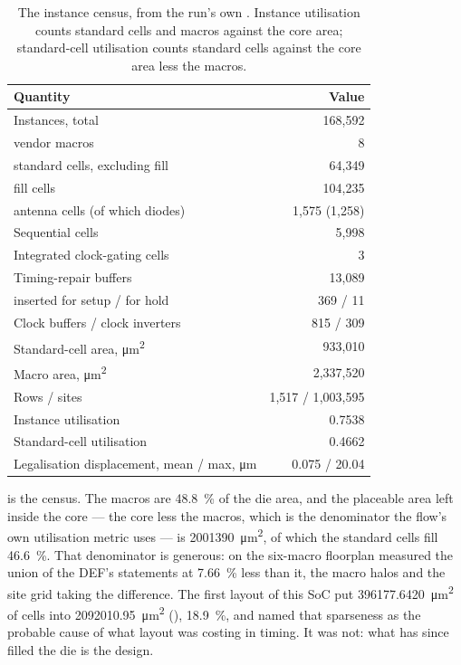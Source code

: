 \begin{table}[tbp]
\centering
\caption{The instance census, from the run's own
. Instance utilisation counts standard cells
and macros against the core area; standard-cell utilisation counts
standard cells against the core area less the macros.}
\label{tab:phys-census}
\small
\begin{tabular}{@{}lr@{}}
\toprule
\textbf{Quantity} & \textbf{Value} \\
\midrule
Instances, total & 168{,}592 \\
\quad vendor macros & 8 \\
\quad standard cells, excluding fill & 64{,}349 \\
\quad fill cells & 104{,}235 \\
\quad antenna cells (of which diodes) & 1{,}575 (1{,}258) \\
Sequential cells & 5{,}998 \\
Integrated clock-gating cells & 3 \\
Timing-repair buffers & 13{,}089 \\
\quad inserted for setup / for hold & 369 / 11 \\
Clock buffers / clock inverters & 815 / 309 \\
Standard-cell area, \si{\um\squared} & 933{,}010 \\
Macro area, \si{\um\squared} & 2{,}337{,}520 \\
Rows / sites & 1{,}517 / 1{,}003{,}595 \\
Instance utilisation & 0.7538 \\
Standard-cell utilisation & 0.4662 \\
Legalisation displacement, mean / max, \si{\um} & 0.075 / 20.04 \\
\bottomrule
\end{tabular}
\end{table}

 is the census. The macros are
\qty{48.8}{\percent} of the die area, and the placeable area left inside
the core --- the core less the macros, which is the denominator the
flow's own utilisation metric uses --- is
\qty{2001390}{\um\squared}, of which the standard cells fill
\qty{46.6}{\percent}. That denominator is generous: on the six-macro
floorplan  measured the union of the DEF's
 statements at \qty{7.66}{\percent} less than it, the macro
halos and the site grid taking the difference. The first layout of this
SoC put \qty{396177.6420}{\um\squared} of cells into
\qty{2092010.95}{\um\squared} (),
\qty{18.9}{\percent}, and
 named that sparseness as the probable cause of
what layout was costing in timing. It was not: what has since filled the
die is the design.

